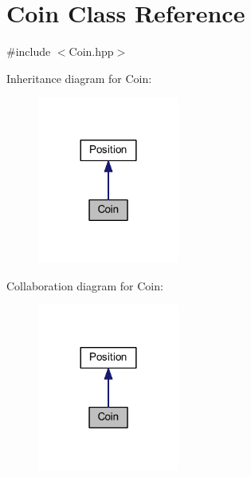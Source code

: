 \hypertarget{class_coin}{}\section{Coin Class Reference}
\label{class_coin}


{\ttfamily \#include $<$Coin.\+hpp$>$}



Inheritance diagram for Coin\+:\nopagebreak
\begin{figure}[H]
\begin{center}
\leavevmode
\includegraphics[width=132pt]{class_coin__inherit__graph}
\end{center}
\end{figure}


Collaboration diagram for Coin\+:\nopagebreak
\begin{figure}[H]
\begin{center}
\leavevmode
\includegraphics[width=132pt]{class_coin__coll__graph}
\end{center}
\end{figure}
